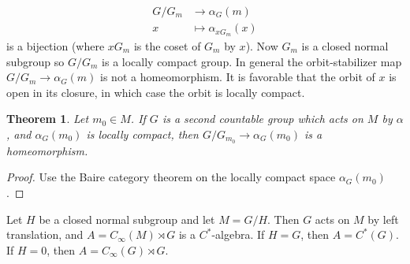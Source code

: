 \documentclass[12pt]{report}
\newtheorem{theorem}{Theorem}[chapter]
\theoremstyle{definition}
\begin{document}
\begin{align*}
    G/G_m &\to \alpha_G(m)\\
    x &\mapsto \alpha_{xG_m}(x)
\end{align*}
    is a bijection (where $xG_m$ is the coset of $G_m$ by $x$). Now $G_m$ is a closed normal subgroup so $G/G_m$ is a locally compact group. In general the orbit-stabilizer map $G/G_m \to \alpha_G(m)$ is not a homeomorphism. It is favorable that the orbit of $x$ is open in its closure, in which case the orbit is locally compact. 
\begin{theorem}
    Let $m_0 \in M$. If $G$ is a second countable group which acts on $M$ by $\alpha$, and $\alpha_G(m_0)$ is locally compact, then $G/G_{m_0} \to \alpha_G(m_0)$ is a homeomorphism.
\end{theorem}
\begin{proof}
    Use the Baire category theorem on the locally compact space $\alpha_G(m_0)$.
\end{proof}
    Let $H$ be a closed normal subgroup and let $M = G/H$. Then $G$ acts on $M$ by left translation, and $A = C_\infty(M) \rtimes G$ is a $C^*$-algebra. If $H = G$, then $A = C^*(G)$. If $H = 0$, then $A = C_\infty(G) \rtimes G$.
\end{document}
